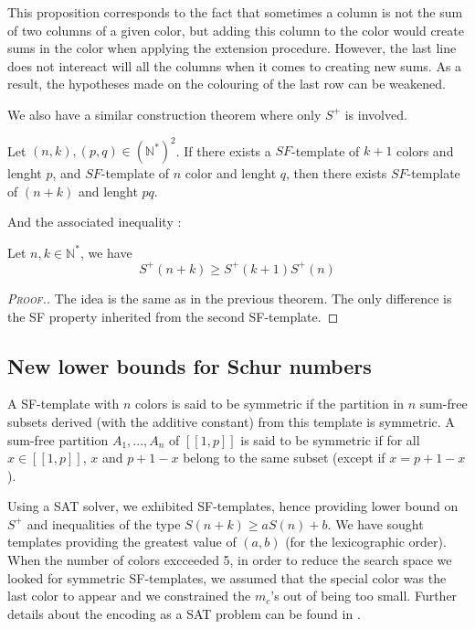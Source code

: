 \begin{remark}
This proposition corresponds to the fact that sometimes a column is not the sum of two columns of a given color, but adding this 
column to the color would create sums in the color when applying the extension procedure. However, the last line does not 
intereact will all the columns when it comes to creating new sums. As a result, the hypotheses made on the colouring of the last 
row can be weakened.
\end{remark}

We also have a similar construction theorem where only \(S^+\) is involved.

\begin{theorem}
	Let \((n,k), (p,q) \in (\mathbb{N}^*)^2\). If there exists a \(SF\)-template of \(k+1\) colors and lenght \(p\),
	and \(SF\)-template of \(n\) color and lenght \(q\), then there exists \(SF\)-template of \((n+k)\) and lenght \(pq\).
\end{theorem}

And the associated inequality :

\begin{corollary}
	Let \(n, k \in \mathbb{N}^*\), we have \\
	\[ S^+(n+k) \geqslant S^+(k+1)S^+(n) \]
\end{corollary}

\begin{proof}[\textsc{Proof.}]
The idea is the same as in the previous theorem. The only difference is the SF property inherited 
from the second SF-template.
\end{proof}


\subsection{New lower bounds for Schur numbers}

\begin{definition}
A SF-template with \(n\) colors is said to be symmetric if the partition in \(n\) sum-free subsets derived (with the additive constant) from this template is symmetric. 
A sum-free partition \(A_1, ..., A_n\) of \([\![1, p]\!]\) is said to be symmetric if for all \( x \in [\![1, p]\!]\), \(x\) and \(p + 1 - x\) belong to the same subset 
(except if \(x = p + 1 - x\)).
\end{definition}

Using a SAT solver, we exhibited SF-templates, hence providing lower bound on \(S^+\) and inequalities 
of the type \(S(n+k) \geqslant a S(n) + b\). We have sought templates providing the greatest value of 
\((a, b)\) (for the lexicographic order). When the number of colors excceeded 5, in order to reduce the search space we 
looked for symmetric SF-templates, we assumed that the special color was the last color to appear and we constrained 
the \(m_c\)'s out of being too small. Further details about the encoding as a SAT problem can be found in \cite{Heule2017}.

